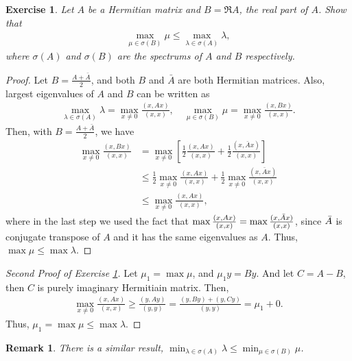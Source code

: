 \documentclass[11pt]{article}
\newtheorem{exercise}{Exercise}[section]
\newtheorem{remark}{Remark}[section]
\theoremstyle{definition}
\numberwithin{equation}{subsection}
\begin{document}
\begin{exercise}\label{aug_2018_1}
Let $A$ be a Hermitian matrix and $B = \Re A$, the real part of $A$. Show that
\begin{align*}
    \max_{\mu \in \sigma(B)} \mu \leq \max_{\lambda \in \sigma(A)} \lambda,
\end{align*}
where $\sigma(A)$ and $\sigma(B)$ are the spectrums of $A$ and $B$ respectively.
\end{exercise}
\begin{proof}
Let $B = \frac{A + \bar{A}}{2}$, and both $B$ and $\bar{A}$ are both Hermitian matrices. Also, largest eigenvalues of $A$ and $B$ can be written as
\begin{align*}
    \max_{\lambda \in \sigma(A)} \lambda = \max_{x \neq 0} \frac{(x, Ax)}{(x,x)}, \quad \max_{\mu \in \sigma(B)} \mu = \max_{x \neq 0} \frac{(x, Bx)}{(x,x)}.
\end{align*}
Then, with $B = \frac{A + \bar{A}}{2}$, we have
\begin{align*}
    \max_{x \neq 0} \frac{(x, Bx)}{(x,x)} & = \max_{x \neq 0} \left[\frac{1}{2} \frac{(x, Ax)}{(x,x)} + \frac{1}{2} \frac{(x, \bar{A}x)}{(x,x)} \right] \\
    & \leq \frac{1}{2} \max_{x \neq 0} \frac{(x, Ax)}{(x,x)} + \frac{1}{2} \max_{x \neq 0} \frac{(x, \bar{A}x)}{(x,x)} \\
    & \leq \max_{x \neq 0} \frac{(x, Ax)}{(x,x)},
\end{align*}
where in the last step we used the fact that $\max \frac{(x, Ax)}{(x,x)} = \max \frac{(x, \Bar{A}x)}{(x,x)}$, since $\Bar{A}$ is conjugate transpose of $A$ and it has the same eigenvalues as $A$. Thus, $\max \mu \leq \max \lambda$.
\end{proof}

\begin{proof}[Second Proof of Exercise \ref{aug_2018_1}]
Let $\mu_1 = \max \mu$, and $\mu_1 y = By$. And let $C = A - B$, then $C$ is purely imaginary Hermitiain matrix. Then,
\begin{align*}
    \max_{x \neq 0} \frac{(x, Ax)}{(x,x)} \geq \frac{(y, Ay)}{(y,y)} = \frac{(y, By) + (y, Cy)}{(y,y)} = \mu_1 + 0.
\end{align*}
Thus, $\mu_1 = \max \mu \leq \max \lambda$.
\end{proof}

\begin{remark}
There is a similar result, $\min_{\lambda \in \sigma(A)} \lambda \leq \min_{\mu \in \sigma(B)} \mu$.
\end{remark}
\end{document}

